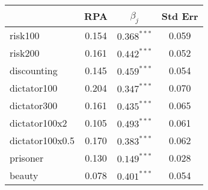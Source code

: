 \begin{tabular}{lccc}
\toprule
 & RPA & $\hat{\beta}_j$ & Std Err \\
\midrule
risk100 & 0.154 & $0.368^{***}$ & 0.059 \\
risk200 & 0.161 & $0.442^{***}$ & 0.052 \\
discounting & 0.145 & $0.459^{***}$ & 0.054 \\
dictator100 & 0.204 & $0.347^{***}$ & 0.070 \\
dictator300 & 0.161 & $0.435^{***}$& 0.065 \\
dictator100x2 & 0.105 & $0.493^{***}$ & 0.061 \\
dictator100x0.5 & 0.170 & $0.383^{***}$ & 0.062 \\
prisoner & 0.130 & $0.149^{***}$ & 0.028 \\
beauty & 0.078 & $0.401^{***}$ & 0.054 \\
\bottomrule
\end{tabular}

